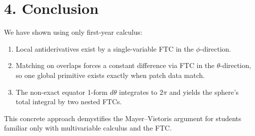 \documentclass[11pt]{article}
\begin{document}
	\section{4. Conclusion}
	We have shown using only first-year calculus:
	\begin{enumerate}
		\item Local antiderivatives exist by a single-variable FTC in the $\phi$-direction.
		\item Matching on overlaps forces a constant difference via FTC in the $\theta$-direction, so one global primitive exists exactly when patch data match.
		\item The non-exact equator 1-form $d\theta$ integrates to $2\pi$ and yields the sphere’s total integral by two nested FTCs.
	\end{enumerate}
	This concrete approach demystifies the Mayer–Vietoris argument for students familiar only with multivariable calculus and the FTC.
\end{document}
